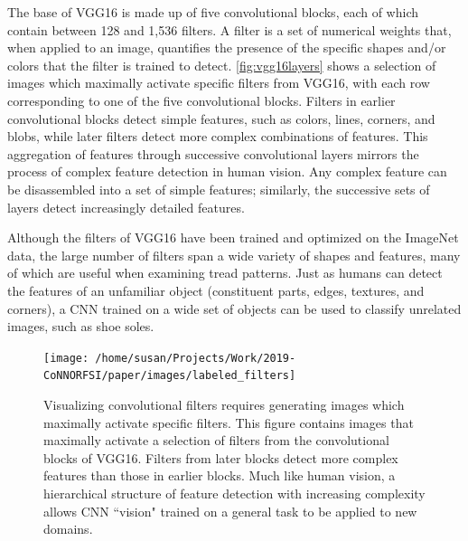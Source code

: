 \documentclass{article}\usepackage[]{graphicx}\usepackage[table]{xcolor}
\newenvironment{knitrout}{}{} %
\begin{document}
The base of VGG16 is made up of five convolutional blocks, each of which contain between 128 and 1,536 filters. A filter is a set of numerical weights that, when applied to an image, quantifies the presence of the specific shapes and/or colors that the filter is trained to detect. \autoref{fig:vgg16layers} shows a selection of images which maximally activate specific filters from VGG16, with each row corresponding to one of the five convolutional blocks. Filters in earlier convolutional blocks detect simple features, such as colors, lines, corners, and blobs, while later filters detect more complex combinations of features. This aggregation of features through successive convolutional layers mirrors the process of complex feature detection in human vision. Any complex feature can be disassembled into a set of simple features; similarly, the successive sets of layers detect increasingly detailed features.

Although the filters of VGG16 have been trained and optimized on the ImageNet data, the large number of filters span a wide variety of shapes and features, many of which are useful when examining tread patterns. Just as humans can detect the features of an unfamiliar object (constituent parts, edges, textures, and corners), a CNN trained on a wide set of objects can be used to classify unrelated images, such as shoe soles.

\begin{knitrout}
\color{fgcolor}\begin{figure}

{\centering \texttt{[image: /home/susan/Projects/Work/2019-CoNNORFSI/paper/images/labeled\_filters]} 

}

\caption[Visualizing convolutional filters requires generating images which maximally activate specific filters]{Visualizing convolutional filters requires generating images which maximally activate specific filters. This figure contains images that maximally activate a selection of filters from the convolutional blocks of VGG16. Filters from later blocks detect more complex features than those in earlier blocks. Much like human vision, a hierarchical structure of feature detection with increasing complexity allows CNN ``vision" trained on a general task to be applied to new domains.}\label{fig:vgg16layers}
\end{figure}


\end{knitrout}
\end{document}
